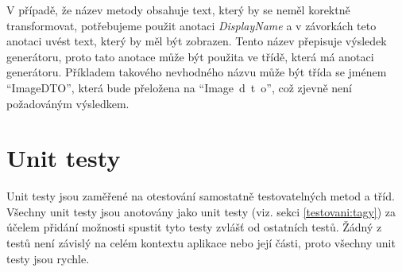     V případě, že název metody obsahuje text, který by se neměl korektně transformovat, potřebujeme použit anotaci \textit{DisplayName} a v závorkách teto anotaci uvést text, který by měl být zobrazen. Tento název přepisuje výsledek generátoru, proto tato anotace může být použita ve třídě, která má anotaci generátoru. Příkladem takového nevhodného názvu může být třída se jménem \enquote{ImageDTO}, která bude přeložena na \enquote{Image~d~t~o}, což zjevně není požadováným výsledkem.




    
\section{Unit testy}\label{testovani:unit}
    Unit testy jsou zaměřené na otestování samostatně testovatelných metod a tříd. Všechny unit testy jsou anotovány jako unit testy (viz. sekci \ref{testovani:tagy}) za účelem přidání možnosti spustit tyto testy zvlášť od ostatních testů. Žádný z testů není závislý na celém kontextu aplikace nebo její části, proto všechny unit testy jsou rychle.
    
